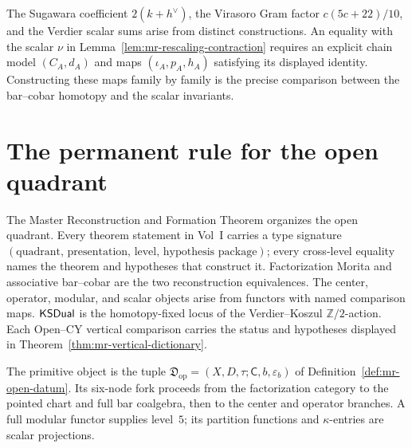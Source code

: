 \begin{remark}
The Sugawara coefficient $2(k+h^\vee)$, the Virasoro Gram factor
$c(5c+22)/10$, and the Verdier scalar sums arise from distinct
constructions.  An equality with the scalar $\nu$ in
Lemma~\ref{lem:mr-rescaling-contraction} requires an explicit chain
model $(C_A,d_A)$ and maps $(\iota_A,p_A,h_A)$ satisfying its displayed
identity.  Constructing these maps family by family is the precise
comparison between the bar--cobar homotopy and the scalar invariants.
\end{remark}

\section{The permanent rule for the open quadrant}
\label{sec:mr-permanent}

The Master Reconstruction and Formation Theorem organizes the open
quadrant.
Every theorem statement in Vol~I carries a type signature
$(\text{quadrant},\,\text{presentation},\,\text{level},\,\text{hypothesis package})$;
every cross-level equality names the theorem and hypotheses that
construct it.  Factorization Morita and associative bar--cobar are the
two reconstruction equivalences.  The center, operator, modular, and
scalar objects arise from functors with named comparison maps.
$\mathsf{KSDual}$ is the homotopy-fixed locus of the Verdier--Koszul
$\mathbb Z/2$-action.  Each Open--CY vertical comparison carries the
status and hypotheses displayed in
Theorem~\ref{thm:mr-vertical-dictionary}.

The primitive object is the tuple
$\mathfrak D_{\mathrm{op}}=(X,D,\tau;\mathsf C,b,\varepsilon_b)$ of
Definition~\ref{def:mr-open-datum}.  Its six-node fork proceeds from
the factorization category to the pointed chart and full bar
coalgebra, then to the center and operator branches.  A full modular
functor supplies level~$5$; its partition functions and
$\kappa$-entries are scalar projections.
